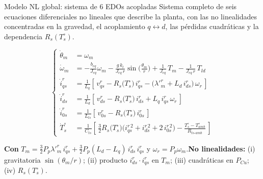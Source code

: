 \documentclass[aspectratio=169,t]{beamer}
\begin{document}
\begin{frame}{Modelo NL global: sistema de 6 EDOs acopladas}
{\small\color{uncGray}Sistema completo de seis ecuaciones diferenciales no lineales que describe la planta, con las no linealidades concentradas en la gravedad, el acoplamiento $q\!\leftrightarrow\!d$, las pérdidas cuadráticas y la dependencia $R_s(T_s^\circ)$.}\par
\vspace{2mm}

\footnotesize
\begin{equation*}
\left\{
\begin{aligned}
\dot{\theta}_m &= \omega_m \\[1pt]
\dot{\omega}_m &= -\tfrac{b_{eq}}{J_{eq}}\omega_m - \tfrac{g\,k_l}{J_{eq}\,r}\sin\!\big(\tfrac{\theta_m}{r}\big) + \tfrac{1}{J_{eq}}\,T_m - \tfrac{1}{J_{eq}\,r}\,T_{ld} \\[1pt]
\dot{i}_{qs}^{r} &= \tfrac{1}{L_q}\!\left[\,v_{qs}^{r} - R_s\!\big(T_s^\circ\big)\, i_{qs}^{r} - \big(\lambda'^r_m + L_d\,i_{ds}^{r}\big)\,\omega_r\,\right] \\[1pt]
\dot{i}_{ds}^{r} &= \tfrac{1}{L_d}\!\left[\,v_{ds}^{r} - R_s\!\big(T_s^\circ\big)\, i_{ds}^{r} + L_q\,i_{qs}^{r}\,\omega_r\,\right] \\[1pt]
\dot{i}_{0s}^{r} &= \tfrac{1}{L_{ls}}\!\left[\,v_{0s}^{r} - R_s\!\big(T_s^\circ\big)\, i_{0s}^{r}\,\right] \\[1pt]
\dot{T}_s^\circ &= \tfrac{1}{C_{ts}}\!\left[\,\tfrac{3}{2}R_s\!\big(T_s^\circ\big)\big(i_{qs}^{r\,2}+i_{ds}^{r\,2}+2\,i_{0s}^{r\,2}\big) - \tfrac{T_s^\circ - T_{amb}^\circ}{R_{ts\text{-}amb}}\,\right]
\end{aligned}\right.
\end{equation*}
\normalsize

\vspace{1mm}
{\small \textbf{Con} $T_m = \tfrac{3}{2}P_p\lambda'^r_m\,i_{qs}^{r} + \tfrac{3}{2}P_p(L_d-L_q)\,i_{ds}^{r}\,i_{qs}^{r}$ \;y\; $\omega_r = P_p\omega_m$.\quad \textbf{No linealidades:} (i) gravitatoria $\sin(\theta_m/r)$; (ii) producto $i_{ds}^{r}\!\cdot\! i_{qs}^{r}$ en $T_m$; (iii) cuadráticas en $P_{Cu}$; (iv) $R_s(T_s^\circ)$.}
\end{frame}
\end{document}

